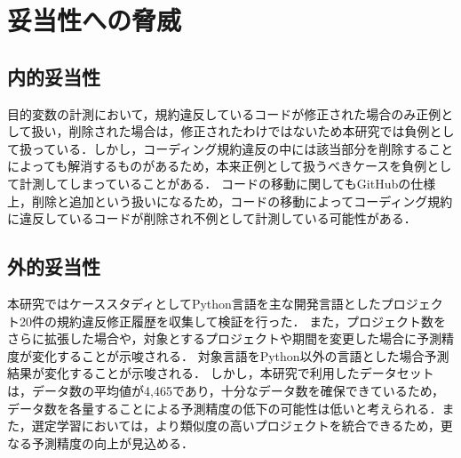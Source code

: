 \documentclass[submit]{ipsj}
\begin{document}
\section{妥当性への脅威}\label{chap:heuristic}
\subsection{内的妥当性}


目的変数の計測において，規約違反しているコードが修正された場合のみ正例として扱い，削除された場合は，修正されたわけではないため本研究では負例として扱っている．しかし，コーディング規約違反の中には該当部分を削除することによっても解消するものがあるため，本来正例として扱うべきケースを負例として計測してしまっていることがある．
コードの移動に関してもGitHubの仕様上，削除と追加という扱いになるため，コードの移動によってコーディング規約に違反しているコードが削除され不例として計測している可能性がある．




\subsection{外的妥当性}

本研究ではケーススタディとしてPython言語を主な開発言語としたプロジェクト20件の規約違反修正履歴を収集して検証を行った．
また，プロジェクト数をさらに拡張した場合や，対象とするプロジェクトや期間を変更した場合に予測精度が変化することが示唆される．
対象言語をPython以外の言語とした場合予測結果が変化することが示唆される．
しかし，本研究で利用したデータセットは，データ数の平均値が4,465であり，十分なデータ数を確保できているため，データ数を各量することによる予測精度の低下の可能性は低いと考えられる．また，選定学習においては，より類似度の高いプロジェクトを統合できるため，更なる予測精度の向上が見込める．
\end{document}
